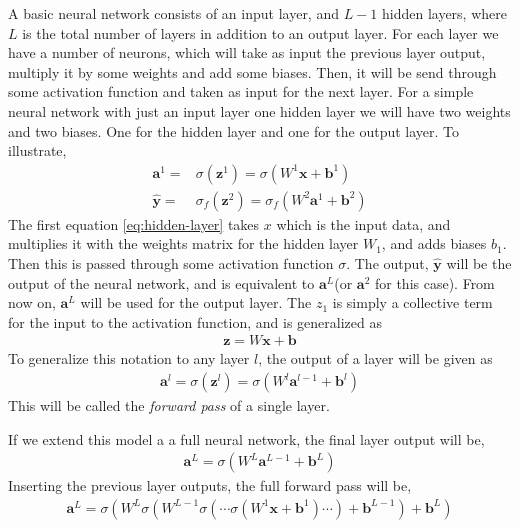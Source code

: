 \documentclass[a4paper,10pt]{article}
\begin{document}
A basic neural network consists of an input layer, and $L-1$ hidden layers, where $L$ is the total number of layers in addition to an output layer. For each layer we have a number of neurons, which will take as input the previous layer output, multiply it by some weights and add some biases. Then, it will be send through some activation function and taken as input for the next layer. For a simple neural network with just an input layer one hidden layer we will have two weights and two biases. One for the hidden layer and one for the output layer. To illustrate,
\begin{align}
    \bm{a}^1 =& \sigma(\bm{z}^1) = \sigma(W^1 \bm{x} + \bm{b}^1) \label{eq:hidden-layer} \\
    \hat{\bm{y}} =& \sigma_f(\bm{z}^2) = \sigma_f(W^2 \bm{a}^1 + \bm{b}^2) \label{eq:output-layer}
\end{align}
The first equation \eqref{eq:hidden-layer} takes $x$ which is the input data, and multiplies it with the weights matrix for the hidden layer $W_1$, and adds biases $b_1$. Then this is passed through some activation function $\sigma$. The output, $\hat{\bm{y}}$ will be the output of the neural network, and is equivalent to $\bm{a}^L$(or $\bm{a}^2$ for this case). From now on, $\bm{a}^L$ will be used for the output layer. The $z_1$ is simply a collective term for the input to the activation function, and is generalized as
\begin{align}
    \bm{z} = W\bm{x} + \bm{b}
    \label{eq:activation-input}
\end{align}
To generalize this notation to any layer $l$, the output of a layer will be given as 
\begin{align}
    \bm{a}^l = \sigma(\bm{z}^l) = \sigma(W^l\bm{a}^{l-1} + \bm{b}^l)
    \label{eq:forward-pass-single-layer}
\end{align}
This will be called the \textit{forward pass} of a single layer.

If we extend this model a a full neural network, the final layer output will be,
\begin{align}
    \bm{a}^L = \sigma(W^L\bm{a}^{L-1} + \bm{b}^L)
    \label{eq:final-layer-output}
\end{align}
Inserting the previous layer outputs, the full forward pass will be,
\begin{align}
    \bm{a}^L = \sigma(W^L\sigma(W^{L-1}\sigma(\cdots \sigma(W^{1}\bm{x} + \bm{b}^1) \cdots) + \bm{b}^{L-1}) + \bm{b}^L)
    \label{eq:full-forward-pass}
\end{align}
\end{document}
